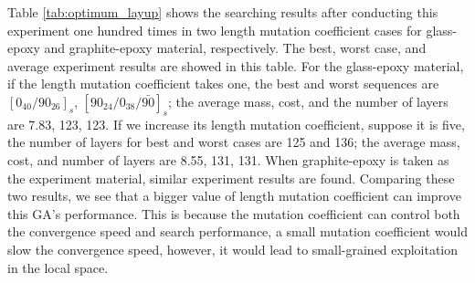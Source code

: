 \documentclass[10pt, journal]{IEEEtran}
\begin{document}
Table \ref{tab:optimum_layup} shows the searching results after conducting this
experiment one hundred times in two length mutation coefficient cases for
glass-epoxy and graphite-epoxy material, respectively. The best, worst case, and
average experiment results are showed in this table.  For the glass-epoxy
material, if the length mutation coefficient takes one, the best and worst
sequences are $[0_{40}/90_{26}]_s$, $[90_{24}/0_{38}/\bar{90}]_s$; the average mass, cost,
and the number of layers are 7.83, 123, 123. If we increase its length mutation
coefficient, suppose it is five, the number of layers for best and worst cases
are 125 and 136;  the average mass, cost, and number of layers are 8.55, 131,
131.  When graphite-epoxy is taken as the experiment material, similar
experiment results are found.  Comparing these two results, we see that a
bigger value of length mutation coefficient can improve this GA's performance.
This is because the mutation coefficient can control both the convergence speed
and search performance, a small mutation coefficient would slow the convergence
speed, however, it would lead to small-grained exploitation in the local space. 
\end{document}
